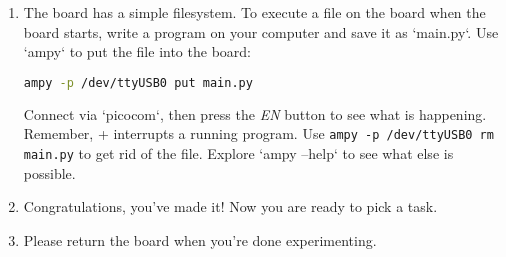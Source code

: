 \documentclass{../tutorial}
\begin{document}
\begin{enumerate}
\item
    The board has a simple filesystem.
    To execute a file on the board when the board starts,
    write a program on your computer and save it as `main.py`.
    Use `ampy` to put the file into the board:

    \begin{lstlisting}[language=bash]
    ampy -p /dev/ttyUSB0 put main.py
    \end{lstlisting}

    Connect via `picocom`, then press the \emph{EN} button to see
    what is happening. Remember, + interrupts a running program.
    Use \lstinline[emph=rm]|ampy -p /dev/ttyUSB0 rm main.py|
    to get rid of the file.
    Explore `ampy --help` to see what else is possible.

\item
    Congratulations, you've made it! Now you are ready to pick a task.

    \begin{comment}
        Don't forget to ask for stickers as a reward for your efforts!
    \end{comment}

\item
    Please return the board when you're done experimenting.

\end{enumerate}
\end{document}
